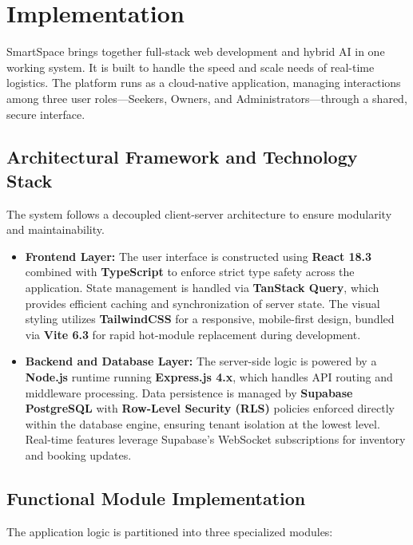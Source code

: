 \documentclass[conference]{IEEEtran}
\begin{document}
\section{Implementation}
SmartSpace brings together full-stack web development and hybrid AI in one working system. It is built to handle the speed and scale needs of real-time logistics. The platform runs as a cloud-native application, managing interactions among three user roles---Seekers, Owners, and Administrators---through a shared, secure interface.

\subsection{Architectural Framework and Technology Stack}
The system follows a decoupled client-server architecture to ensure modularity and maintainability.
\begin{itemize}
    \item \textbf{Frontend Layer:} The user interface is constructed using \textbf{React 18.3} combined with \textbf{TypeScript} to enforce strict type safety across the application. State management is handled via \textbf{TanStack Query}, which provides efficient caching and synchronization of server state. The visual styling utilizes \textbf{TailwindCSS} for a responsive, mobile-first design, bundled via \textbf{Vite 6.3} for rapid hot-module replacement during development.
    \item \textbf{Backend and Database Layer:} The server-side logic is powered by a \textbf{Node.js} runtime running \textbf{Express.js 4.x}, which handles API routing and middleware processing. Data persistence is managed by \textbf{Supabase PostgreSQL} with \textbf{Row-Level Security (RLS)} policies enforced directly within the database engine, ensuring tenant isolation at the lowest level. Real-time features leverage Supabase's WebSocket subscriptions for inventory and booking updates.
\end{itemize}

\subsection{Functional Module Implementation}
The application logic is partitioned into three specialized modules:
\end{document}
